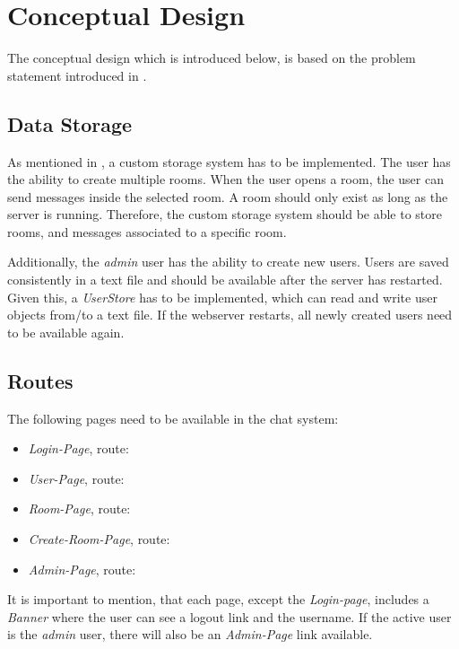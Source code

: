 \section{Conceptual Design}\label{sec:02_design}
The conceptual design which is introduced below, is based on the problem statement introduced in .


\subsection{Data Storage}\label{subsec:02_design_datastorage}
As mentioned in , a custom storage system has to be implemented.
The user has the ability to create multiple rooms. When the user opens a room, the user can send messages inside the selected room. A room should only exist as long as the server is running. Therefore, the custom storage system should be able to store rooms, and messages associated to a specific room.

Additionally, the \textit{admin} user has the ability to create new users. Users are saved consistently in a text file and should be available after the server has restarted.
Given this, a \textit{UserStore} has to be implemented, which can read and write user objects from/to a text file. If the webserver restarts, all newly created users need to be available again.


\subsection{Routes}\label{subsec:02_design_routes}
The following pages need to be available in the chat system:
\begin{itemize}
\item \textit{Login-Page}, route: 
\item \textit{User-Page}, route: 
\item \textit{Room-Page}, route: 
\item \textit{Create-Room-Page}, route: 
\item \textit{Admin-Page}, route: 
\end{itemize}

It is important to mention, that each page, except the \textit{Login-page}, includes a \textit{Banner} where the user can see a logout link and the username. If the active user is the \textit{admin} user, there will also be an \textit{Admin-Page} link available.

